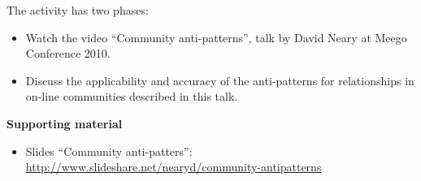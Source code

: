 \documentclass[a4paper]{article}
\begin{document}
The activity has two phases:

\begin{itemize}
 \item Watch the video ``Community anti-patterns'', talk by David Neary at Meego Conference 2010.
 \item Discuss the applicability and accuracy of the anti-patterns for relationships in on-line communities described in this talk.
\end{itemize}

\textbf{Supporting material}

\begin{itemize}
\item Slides ``Community anti-patters'': \url{http://www.slideshare.net/nearyd/community-antipatterns}
\end{itemize}

\end{document}
